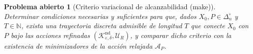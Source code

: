 ﻿\documentclass[12pt]{article}
\newcommand{\fuente}[1]{\textnormal{(#1)}}
\newtheorem{problema}{Problema abierto}[section]
\begin{document}
\begin{problema}[Criterio variacional de alcanzabilidad \fuente{make}]
Determinar condiciones necesarias y suficientes para que, dados \(X_0,P\in \Delta_n^\circ\) y \(T\in\mathbb N\), exista una trayectoria discreta admisible de longitud \(T\) que conecte \(X_0\) con \(P\) bajo las acciones refinadas \((\mathcal K_{\varepsilon,\delta}^{\mathrm{nd}},\mathcal U_R)\), y comparar dicho criterio con la existencia de minimizadores de la acción relajada \(\mathcal A_P\).
\end{problema}


\end{document}
